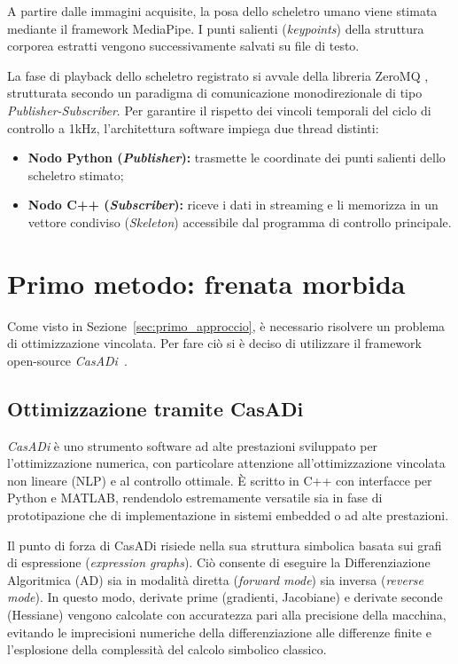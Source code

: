 A partire dalle immagini acquisite, la posa dello scheletro umano viene stimata mediante il framework MediaPipe. I punti salienti (\textit{keypoints}) della struttura corporea estratti vengono successivamente salvati su file di testo.

La fase di playback dello scheletro registrato si avvale della libreria ZeroMQ \cite{hintjens2013zeromq}, strutturata secondo un paradigma di comunicazione monodirezionale di tipo \textit{Publisher-Subscriber}. Per garantire il rispetto dei vincoli temporali del ciclo di controllo a 1kHz, l'architettura software impiega due thread distinti:
\begin{itemize}
	\item \textbf{Nodo Python (\textit{Publisher}):} trasmette le coordinate dei punti salienti dello scheletro stimato;
	\item \textbf{Nodo C++ (\textit{Subscriber}):} riceve i dati in streaming e li memorizza in un vettore condiviso (\textit{Skeleton}) accessibile dal programma di controllo principale.
\end{itemize}


\section{Primo metodo: frenata morbida}
\label{sec:frenata}

Come visto in Sezione~\ref{sec:primo_approccio}, è necessario risolvere un problema di ottimizzazione vincolata. Per fare ciò si è deciso di utilizzare il framework open-source \textit{CasADi}~\cite{Andersson2018}.

\subsection{Ottimizzazione tramite CasADi}
\textit{CasADi} è uno strumento software ad alte prestazioni sviluppato per l'ottimizzazione numerica, con particolare attenzione all'ottimizzazione vincolata non lineare (NLP) e al controllo ottimale. È scritto in C++ con interfacce per Python e MATLAB, rendendolo estremamente versatile sia in fase di prototipazione che di implementazione in sistemi embedded o ad alte prestazioni.

Il punto di forza di CasADi risiede nella sua struttura simbolica basata sui grafi di espressione (\textit{expression graphs}). Ciò consente di eseguire la Differenziazione Algoritmica (AD) sia in modalità diretta (\textit{forward mode}) sia inversa (\textit{reverse mode}). In questo modo, derivate prime (gradienti, Jacobiane) e derivate seconde (Hessiane) vengono calcolate con accuratezza pari alla precisione della macchina, evitando le imprecisioni numeriche della differenziazione alle differenze finite e l'esplosione della complessità del calcolo simbolico classico.

